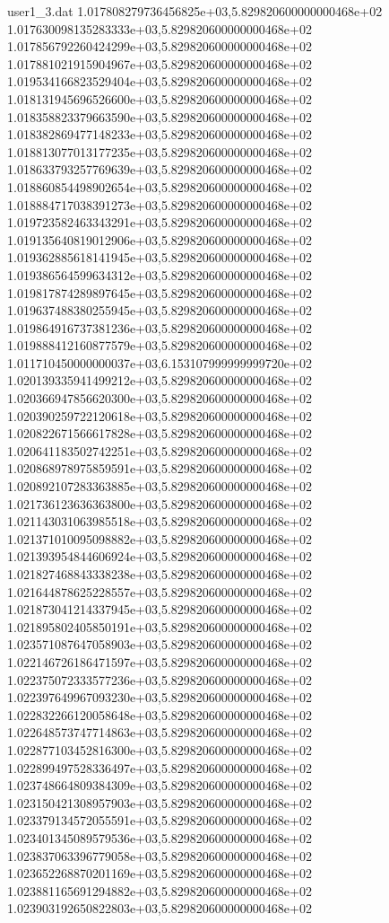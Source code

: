 \begin{filecontents}{user1_3.dat}
1.017808279736456825e+03,5.829820600000000468e+02
1.017630098135283333e+03,5.829820600000000468e+02
1.017856792260424299e+03,5.829820600000000468e+02
1.017881021915904967e+03,5.829820600000000468e+02
1.019534166823529404e+03,5.829820600000000468e+02
1.018131945696526600e+03,5.829820600000000468e+02
1.018358823379663590e+03,5.829820600000000468e+02
1.018382869477148233e+03,5.829820600000000468e+02
1.018813077013177235e+03,5.829820600000000468e+02
1.018633793257769639e+03,5.829820600000000468e+02
1.018860854498902654e+03,5.829820600000000468e+02
1.018884717038391273e+03,5.829820600000000468e+02
1.019723582463343291e+03,5.829820600000000468e+02
1.019135640819012906e+03,5.829820600000000468e+02
1.019362885618141945e+03,5.829820600000000468e+02
1.019386564599634312e+03,5.829820600000000468e+02
1.019817874289897645e+03,5.829820600000000468e+02
1.019637488380255945e+03,5.829820600000000468e+02
1.019864916737381236e+03,5.829820600000000468e+02
1.019888412160877579e+03,5.829820600000000468e+02
1.011710450000000037e+03,6.153107999999999720e+02
1.020139335941499212e+03,5.829820600000000468e+02
1.020366947856620300e+03,5.829820600000000468e+02
1.020390259722120618e+03,5.829820600000000468e+02
1.020822671566617828e+03,5.829820600000000468e+02
1.020641183502742251e+03,5.829820600000000468e+02
1.020868978975859591e+03,5.829820600000000468e+02
1.020892107283363885e+03,5.829820600000000468e+02
1.021736123636363800e+03,5.829820600000000468e+02
1.021143031063985518e+03,5.829820600000000468e+02
1.021371010095098882e+03,5.829820600000000468e+02
1.021393954844606924e+03,5.829820600000000468e+02
1.021827468843338238e+03,5.829820600000000468e+02
1.021644878625228557e+03,5.829820600000000468e+02
1.021873041214337945e+03,5.829820600000000468e+02
1.021895802405850191e+03,5.829820600000000468e+02
1.023571087647058903e+03,5.829820600000000468e+02
1.022146726186471597e+03,5.829820600000000468e+02
1.022375072333577236e+03,5.829820600000000468e+02
1.022397649967093230e+03,5.829820600000000468e+02
1.022832266120058648e+03,5.829820600000000468e+02
1.022648573747714863e+03,5.829820600000000468e+02
1.022877103452816300e+03,5.829820600000000468e+02
1.022899497528336497e+03,5.829820600000000468e+02
1.023748664809384309e+03,5.829820600000000468e+02
1.023150421308957903e+03,5.829820600000000468e+02
1.023379134572055591e+03,5.829820600000000468e+02
1.023401345089579536e+03,5.829820600000000468e+02
1.023837063396779058e+03,5.829820600000000468e+02
1.023652268870201169e+03,5.829820600000000468e+02
1.023881165691294882e+03,5.829820600000000468e+02
1.023903192650822803e+03,5.829820600000000468e+02

\end{filecontents}
